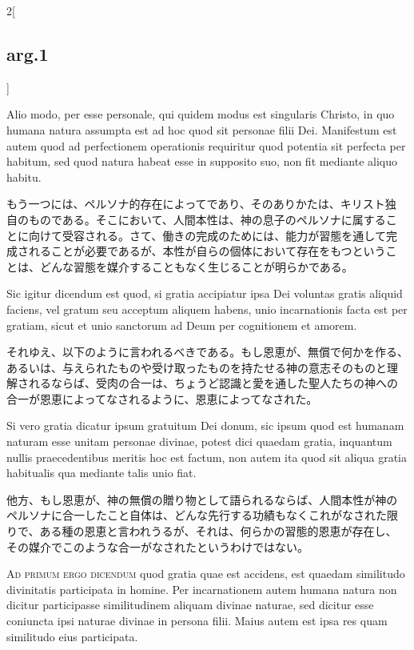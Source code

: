 \documentclass[paper=a4paper,fontsize=10pt,jafontsize=9pt,titlepage]{jlreq}
\begin{document}
\begin{paracol}{2}[\subsection{arg.1}]
\switchcolumn*

Alio modo, per esse personale, qui quidem modus est singularis
Christo, in quo humana natura assumpta est ad hoc quod sit personae
filii Dei. Manifestum est autem quod ad perfectionem operationis
requiritur quod potentia sit perfecta per habitum, sed quod natura
habeat esse in supposito suo, non fit mediante aliquo habitu.

\switchcolumn

もう一つには、ペルソナ的存在によってであり、そのありかたは、キリスト独
自のものである。そこにおいて、人間本性は、神の息子のペルソナに属するこ
とに向けて受容される。さて、働きの完成のためには、能力が習態を通して完
成されることが必要であるが、本性が自らの個体において存在をもつというこ
とは、どんな習態を媒介することもなく生じることが明らかである。

\switchcolumn*

Sic igitur dicendum est quod, si gratia accipiatur ipsa Dei voluntas
gratis aliquid faciens, vel gratum seu acceptum aliquem habens, unio
incarnationis facta est per gratiam, sicut et unio sanctorum ad Deum
per cognitionem et amorem.

\switchcolumn

それゆえ、以下のように言われるべきである。もし恩恵が、無償で何かを作る、
あるいは、与えられたものや受け取ったものを持たせる神の意志そのものと理
解されるならば、受肉の合一は、ちょうど認識と愛を通した聖人たちの神への
合一が恩恵によってなされるように、恩恵によってなされた。

\switchcolumn*

Si vero gratia dicatur ipsum gratuitum Dei donum, sic ipsum quod est
humanam naturam esse unitam personae divinae, potest dici quaedam
gratia, inquantum nullis praecedentibus meritis hoc est factum, non
autem ita quod sit aliqua gratia habitualis qua mediante talis unio
fiat.

\switchcolumn

他方、もし恩恵が、神の無償の贈り物として語られるならば、人間本性が神の
ペルソナに合一したこと自体は、どんな先行する功績もなくこれがなされた限
りで、ある種の恩恵と言われうるが、それは、何らかの習態的恩恵が存在し、
その媒介でこのような合一がなされたというわけではない。

\switchcolumn*[\subsection{ad.1}]

{\scshape Ad primum ergo dicendum} quod gratia quae est accidens, est
quaedam similitudo divinitatis participata in homine. Per
incarnationem autem humana natura non dicitur participasse
similitudinem aliquam divinae naturae, sed dicitur esse coniuncta ipsi
naturae divinae in persona filii. Maius autem est ipsa res quam
similitudo eius participata.


\end{paracol}
\end{document}
